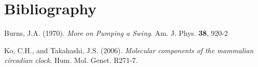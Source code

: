 \documentclass[11pt,letter, english,%
]{article}
\begin{document}
\begin{abstract}
\end{abstract}









\section*{Bibliography}
\noindent
Burns, J.A. (1970). \textit{More on Pumping a Swing}. Am. J. Phys. \textbf{38}, 920-2

\bigskip\noindent
Ko, C.H., and Takahashi, J.S. (2006). \textit{Molecular components of the
mammalian circadian clock}. Hum. Mol. Genet. R271-7.
\end{document}

